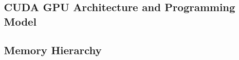 \documentclass[12pt,a4paper,final]{article}
\begin{document}
\begin{spacing}{2.5}


%
%


%

\section{CUDA GPU Architecture and  Programming Model} \label{programming model}
\subsection{Memory Hierarchy}  

\end{spacing}
\end{document}
